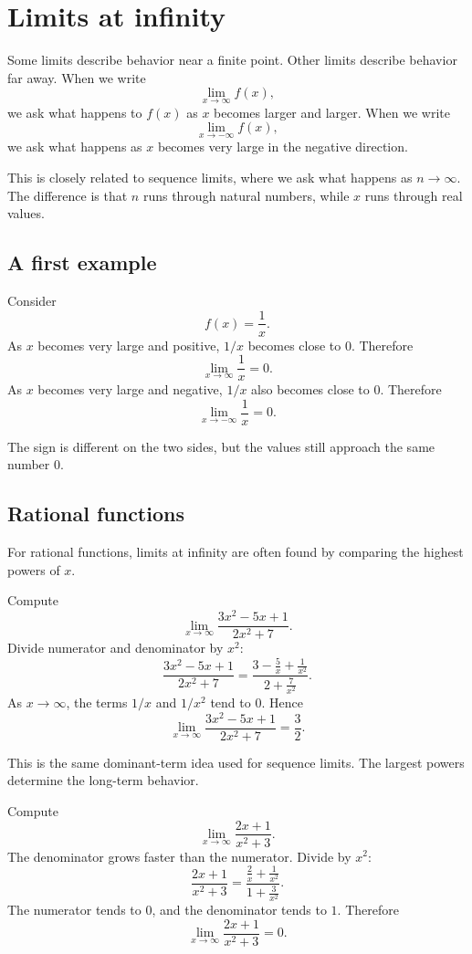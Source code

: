 \section{Limits at infinity}

Some limits describe behavior near a finite point. Other limits describe behavior far away. When we write
\[
\lim_{x\to\infty}f(x),
\]
we ask what happens to \(f(x)\) as \(x\) becomes larger and larger. When we write
\[
\lim_{x\to-\infty}f(x),
\]
we ask what happens as \(x\) becomes very large in the negative direction.

This is closely related to sequence limits, where we ask what happens as \(n\to\infty\). The difference is that \(n\) runs through natural numbers, while \(x\) runs through real values.

\subsection*{A first example}

Consider
\[
f(x)=\frac1x.
\]
As \(x\) becomes very large and positive, \(1/x\) becomes close to \(0\). Therefore
\[
\lim_{x\to\infty}\frac1x=0.
\]
As \(x\) becomes very large and negative, \(1/x\) also becomes close to \(0\). Therefore
\[
\lim_{x\to-\infty}\frac1x=0.
\]

The sign is different on the two sides, but the values still approach the same number \(0\).

\subsection*{Rational functions}

For rational functions, limits at infinity are often found by comparing the highest powers of \(x\).

\begin{examplebox}
Compute
\[
\lim_{x\to\infty}\frac{3x^2-5x+1}{2x^2+7}.
\]
Divide numerator and denominator by \(x^2\):
\[
\frac{3x^2-5x+1}{2x^2+7}
=
\frac{3-\frac5x+\frac1{x^2}}{2+\frac7{x^2}}.
\]
As \(x\to\infty\), the terms \(1/x\) and \(1/x^2\) tend to \(0\). Hence
\[
\lim_{x\to\infty}\frac{3x^2-5x+1}{2x^2+7}=\frac32.
\]
\end{examplebox}

This is the same dominant-term idea used for sequence limits. The largest powers determine the long-term behavior.

\begin{examplebox}
Compute
\[
\lim_{x\to\infty}\frac{2x+1}{x^2+3}.
\]
The denominator grows faster than the numerator. Divide by \(x^2\):
\[
\frac{2x+1}{x^2+3}=\frac{\frac2x+\frac1{x^2}}{1+\frac3{x^2}}.
\]
The numerator tends to \(0\), and the denominator tends to \(1\). Therefore
\[
\lim_{x\to\infty}\frac{2x+1}{x^2+3}=0.
\]
\end{examplebox}

